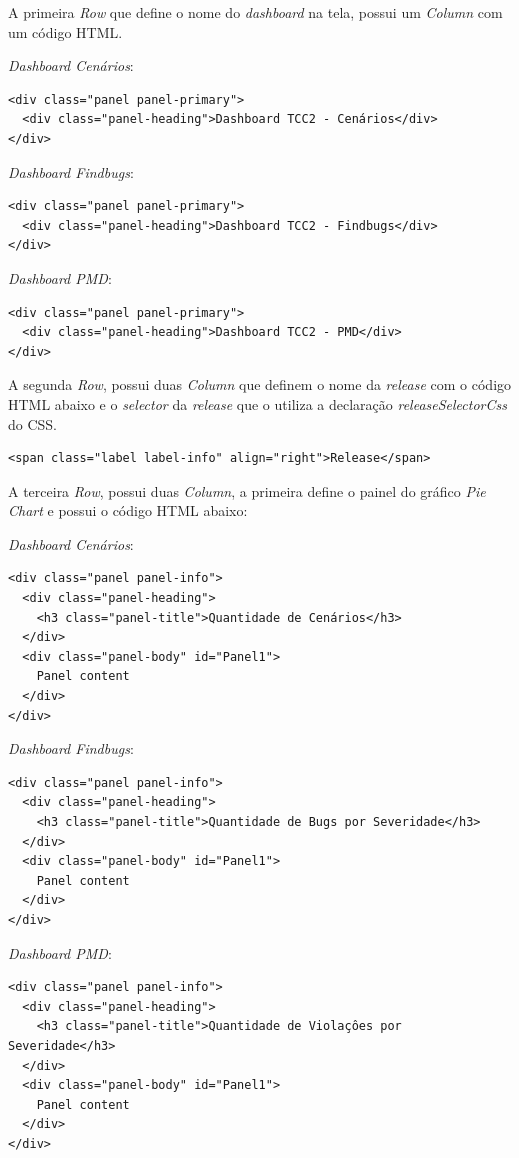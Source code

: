 \begin{apendicesenv}
A primeira \textit{Row} que define o nome do \textit{dashboard} na tela, possui um \textit{Column} com um código HTML.

\textit{Dashboard Cenários}:
{\color{blue}
\begin{verbatim}
<div class="panel panel-primary">
  <div class="panel-heading">Dashboard TCC2 - Cenários</div>
</div> 
\end{verbatim} 
}

\textit{Dashboard Findbugs}:
{\color{blue}
\begin{verbatim}
<div class="panel panel-primary">
  <div class="panel-heading">Dashboard TCC2 - Findbugs</div>
</div> 
\end{verbatim} 
}

\textit{Dashboard PMD}:
{\color{blue}
\begin{verbatim}
<div class="panel panel-primary">
  <div class="panel-heading">Dashboard TCC2 - PMD</div>
</div> 
\end{verbatim} 
}

A segunda \textit{Row}, possui duas \textit{Column} que definem o nome da \textit{release} com o código HTML abaixo e o \textit{selector} da \textit{release} que o utiliza a declaração \textit{releaseSelectorCss} do CSS.

{\color{blue}
\begin{verbatim}
<span class="label label-info" align="right">Release</span> 
\end{verbatim}
}

A terceira \textit{Row}, possui duas \textit{Column}, a primeira define o painel do gráfico \textit{Pie Chart} e possui o código HTML abaixo:  

\textit{Dashboard Cenários}:
{\color{blue}
\begin{verbatim}
<div class="panel panel-info">
  <div class="panel-heading">
    <h3 class="panel-title">Quantidade de Cenários</h3>
  </div>
  <div class="panel-body" id="Panel1">
    Panel content
  </div>
</div> 
\end{verbatim}
}

\textit{Dashboard Findbugs}:
{\color{blue}
\begin{verbatim}
<div class="panel panel-info">
  <div class="panel-heading">
    <h3 class="panel-title">Quantidade de Bugs por Severidade</h3>
  </div>
  <div class="panel-body" id="Panel1">
    Panel content
  </div>
</div> 
\end{verbatim}
}

\textit{Dashboard PMD}:
{\color{blue}
\begin{verbatim}
<div class="panel panel-info">
  <div class="panel-heading">
    <h3 class="panel-title">Quantidade de Violaçôes por Severidade</h3>
  </div>
  <div class="panel-body" id="Panel1">
    Panel content
  </div>
</div> 
\end{verbatim}
}


\end{apendicesenv}

